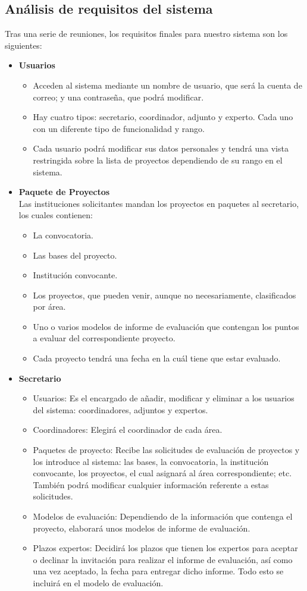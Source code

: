 \documentclass[a4paper,12pt,spanish,twoside]{article}
\begin{document}
\subsection{Análisis de requisitos del sistema}
Tras una serie de reuniones, los requisitos finales para nuestro sistema son los siguientes:
\begin{itemize}
\item \textbf{Usuarios}
\begin{itemize}
\item Acceden al sistema mediante un nombre de usuario, que será la cuenta de correo; y una contraseña, que podrá modificar.
\item Hay cuatro tipos: secretario, coordinador, adjunto y experto. Cada uno con un diferente tipo de funcionalidad y rango.
\item Cada usuario podrá modificar sus datos personales y tendrá una vista restringida sobre la lista de proyectos dependiendo 
de su rango en el sistema.
\end{itemize}

\item \textbf{Paquete de Proyectos}
\\Las instituciones solicitantes mandan los proyectos en paquetes al secretario, los cuales contienen:
\begin{itemize}
\item La convocatoria.
\item Las bases del proyecto.
\item Institución convocante.
\item Los proyectos, que pueden venir, aunque no necesariamente, clasificados por área.
\item Uno o varios modelos de informe de evaluación que contengan los puntos a evaluar del correspondiente proyecto. 
\item Cada proyecto tendrá una fecha en la cuál tiene que estar evaluado.
\end{itemize}
\item \textbf{Secretario}
\begin{itemize}
\item Usuarios: Es el encargado de añadir, modificar y eliminar a los usuarios del sistema: coordinadores, adjuntos 
y expertos.
\item Coordinadores: Elegirá el coordinador de cada área.
\item Paquetes de proyecto: Recibe las solicitudes de evaluación de proyectos y los introduce al sistema: las bases, 
la convocatoria, la institución convocante, los proyectos, el cual asignará al área correspondiente; etc. También 
podrá modificar cualquier información referente a estas solicitudes. 
\item Modelos de evaluación: Dependiendo de la información que contenga el proyecto, elaborará unos modelos de informe 
de evaluación.
\item Plazos expertos: Decidirá los plazos que tienen los expertos para aceptar o declinar la invitación para realizar 
el informe de evaluación, así como una vez aceptado, la fecha para entregar dicho informe. Todo esto se incluirá en el modelo de evaluación.


\end{itemize}
\end{itemize}
\end{document}

